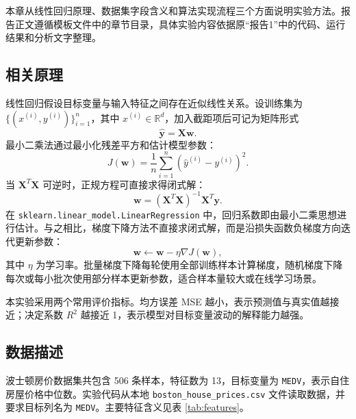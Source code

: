 \documentclass[UTF8,a4paper,12pt]{ctexart}
\begin{document}
本章从线性回归原理、数据集字段含义和算法实现流程三个方面说明实验方法。报告正文遵循模板文件中的章节目录，具体实验内容依据原“报告1”中的代码、运行结果和分析文字整理。

\subsection{相关原理}

线性回归假设目标变量与输入特征之间存在近似线性关系。设训练集为 $\{(x^{(i)},y^{(i)})\}_{i=1}^{n}$，其中 $x^{(i)}\in \mathbb{R}^d$，加入截距项后可记为矩阵形式
\begin{equation}
    \hat{\mathbf{y}} = \mathbf{X}\mathbf{w}.
\end{equation}
最小二乘法通过最小化残差平方和估计模型参数：
\begin{equation}
    J(\mathbf{w})=\frac{1}{n}\sum_{i=1}^{n}(\hat{y}^{(i)}-y^{(i)})^2 .
\end{equation}
当 $\mathbf{X}^{T}\mathbf{X}$ 可逆时，正规方程可直接求得闭式解：
\begin{equation}
    \mathbf{w}=(\mathbf{X}^{T}\mathbf{X})^{-1}\mathbf{X}^{T}\mathbf{y}.
\end{equation}
在 \texttt{sklearn.linear\_model.LinearRegression} 中，回归系数即由最小二乘思想进行估计。与之相比，梯度下降方法不直接求闭式解，而是沿损失函数负梯度方向迭代更新参数：
\begin{equation}
    \mathbf{w}\leftarrow \mathbf{w}-\eta \nabla J(\mathbf{w}),
\end{equation}
其中 $\eta$ 为学习率。批量梯度下降每轮使用全部训练样本计算梯度，随机梯度下降每次或每小批次使用部分样本更新参数，适合样本量较大或在线学习场景。

本实验采用两个常用评价指标。均方误差 MSE 越小，表示预测值与真实值越接近；决定系数 $R^2$ 越接近 1，表示模型对目标变量波动的解释能力越强。

\subsection{数据描述}

波士顿房价数据集共包含 506 条样本，特征数为 13，目标变量为 \texttt{MEDV}，表示自住房屋价格中位数。实验代码从本地 \texttt{boston\_house\_prices.csv} 文件读取数据，并要求目标列名为 \texttt{MEDV}。主要特征含义见表 \ref{tab:features}。
\end{document}

